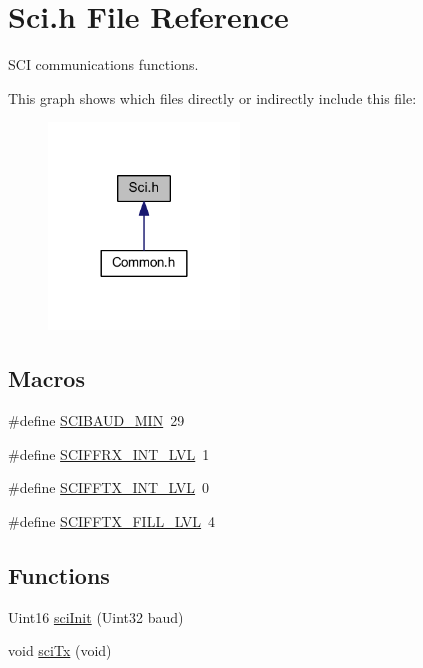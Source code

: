 \hypertarget{a00028}{\section{Sci.\-h File Reference}
\label{a00028}
}


S\-C\-I communications functions.  


This graph shows which files directly or indirectly include this file\-:
\nopagebreak
\begin{figure}[H]
\begin{center}
\leavevmode
\includegraphics[width=144pt]{a00053}
\end{center}
\end{figure}
\subsection*{Macros}
\begin{DoxyCompactItemize}
\item 
\#define \hyperlink{a00028_a0e4c420431b12616b61e9f3a28f07e4d}{S\-C\-I\-B\-A\-U\-D\-\_\-\-M\-I\-N}~29
\item 
\#define \hyperlink{a00028_a5733933fffc18dbcb8bc9404e80bc493}{S\-C\-I\-F\-F\-R\-X\-\_\-\-I\-N\-T\-\_\-\-L\-V\-L}~1
\item 
\#define \hyperlink{a00028_a5340c9de55b8e5c65ef801d2dcabffd7}{S\-C\-I\-F\-F\-T\-X\-\_\-\-I\-N\-T\-\_\-\-L\-V\-L}~0
\item 
\#define \hyperlink{a00028_af0368b1c16e194a32bf4ce09eb937930}{S\-C\-I\-F\-F\-T\-X\-\_\-\-F\-I\-L\-L\-\_\-\-L\-V\-L}~4
\end{DoxyCompactItemize}
\subsection*{Functions}
\begin{DoxyCompactItemize}
\item 
Uint16 \hyperlink{a00028_a1f05b9c5226c73b67c1d6c3bf7f80b52}{sci\-Init} (Uint32 baud)
\item 
void \hyperlink{a00028_a941bdbf3e64ac5f4492a7f7c5936b445}{sci\-Tx} (void)
\end{DoxyCompactItemize}


